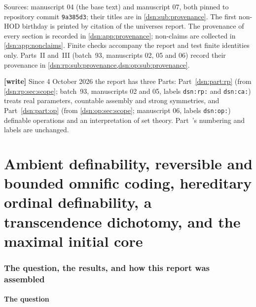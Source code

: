 \documentclass[11pt,a4paper]{article}
\numberwithin{equation}{section}
\theoremstyle{definition}
\theoremstyle{remark}
\newcommand{\HOD}{\mathrm{HOD}}
\begin{document}
\begin{titlepage}
\begin{minipage}{\textwidth}
\begin{abstract}
Part~I merges two independently written manuscripts and Part~II two
more; shared results are printed once with their sources named, and every
source's limitations are kept. It is an AI-assisted draft: it has not been
refereed, and nothing in it has been formalized in Lean.
\end{abstract}
\end{minipage}
\vfill
\begin{minipage}{\textwidth}
\footnotesize
Sources: manuscript 04 (the base text) and manuscript 07, both pinned to
repository commit \texttt{9a385d3}; their titles are in
\cref{dsn:sub:provenance}. The first non-$\HOD$ birthday is printed by
citation of the universes report. The provenance of every section is
recorded in \cref{dsn:app:provenance}; non-claims are collected in
\cref{dsn:app:nonclaims}. Finite checks accompany the report and test
finite identities only. Parts~II and~III (batch~93, manuscripts 02, 05 and
06) record their provenance in \cref{dsn:rp:sub:provenance,dsn:op:sub:provenance}.
\end{minipage}
\end{titlepage}
\hypersetup{pageanchor=true}
\setcounter{tocdepth}{2}
\begingroup\small\setlength{\parskip}{0pt}
\tableofcontents
\endgroup
{\footnotesize\noindent\textbf{[write]} Since 4 October 2026 the report has three Parts:
Part~\ref{dsn:part:rp} (from \cref{dsn:rp:sec:scope}; batch~93, manuscripts 02
and 05, labels \texttt{dsn:rp:} and \texttt{dsn:ca:}) treats real parameters,
countable assembly and strong symmetries, and Part~\ref{dsn:part:op} (from
\cref{dsn:op:sec:scope}; manuscript 06, labels \texttt{dsn:op:}) definable
operations and an interpretation of set theory. Part~\ref{dsn:part:one}'s
numbering and labels are unchanged.\par}
\clearpage

\part{Ambient definability, reversible and bounded omnific coding, hereditary ordinal definability, a transcendence dichotomy, and the maximal initial core}
\label{dsn:part:one}

\section{The question, the results, and how this report was assembled}
\label{dsn:sec:intro}

\subsection{The question}
\end{document}
